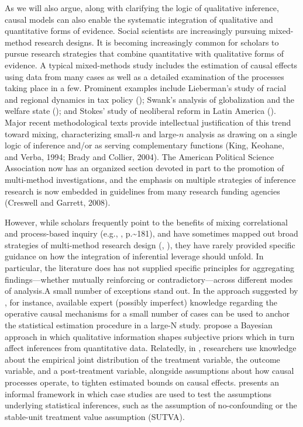\documentclass[12pt,]{book}
\begin{document}
As we will also argue, along with clarifying the logic of qualitative inference, causal models can also enable the systematic integration of qualitative and quantitative forms of evidence. Social scientists are increasingly pursuing mixed-method research designs. It is becoming increasingly common for scholars to pursue research strategies that combine quantitative with qualitative forms of evidence. A typical mixed-methods study includes the estimation of causal effects using data from many cases as well as a detailed examination of the processes taking place in a few. Prominent examples include Lieberman's study of racial and regional dynamics in tax policy (\citet{lieberman2003race}); Swank's analysis of globalization and the welfare state (\citet{swank2002global}); and Stokes' study of neoliberal reform in Latin America (\citet{stokes2001mandates}). Major recent methodological texts provide intellectual justification of this trend toward mixing, characterizing small-\(n\) and large-\(n\) analysis as drawing on a single logic of inference and/or as serving complementary functions (King, Keohane, and Verba, 1994; Brady and Collier, 2004). The American Political Science Association now has an organized section devoted in part to the promotion of multi-method investigations, and the emphasis on multiple strategies of inference research is now embedded in guidelines from many research funding agencies (Creswell and Garrett, 2008).

However, while scholars frequently point to the benefits of mixing correlational and process-based inquiry (e.g., \citet{collier2010sources}, p.\textasciitilde{}181), and have sometimes mapped out broad strategies of multi-method research design (\citet{Lieberman2005nested}, \citet{SeawrightGerring2008}), they have rarely provided specific guidance on how the integration of inferential leverage should unfold. In particular, the literature does has not supplied specific principles for aggregating findings---whether mutually reinforcing or contradictory---across different modes of analysis.A small number of exceptions stand out. In the approach suggested by \citet{gordon2004quantitative}, for instance, available expert (possibly imperfect) knowledge regarding the operative causal mechanisms for a small number of cases can be used to anchor the statistical estimation procedure in a large-N study. \citet{WesternJackman1994} propose a Bayesian approach in which qualitative information shapes subjective priors which in turn affect inferences from quantitative data. Relatedly, in \citet{GlynnQuinn2011}, researchers use knowledge about the empirical joint distribution of the treatment variable, the outcome variable, and a post-treatment variable, alongside assumptions about how causal processes operate, to tighten estimated bounds on causal effects. \citet{seawrightbook} presents an informal framework in which case studies are used to test the assumptions underlying statistical inferences, such as the assumption of no-confounding or the stable-unit treatment value assumption (SUTVA).
\end{document}
